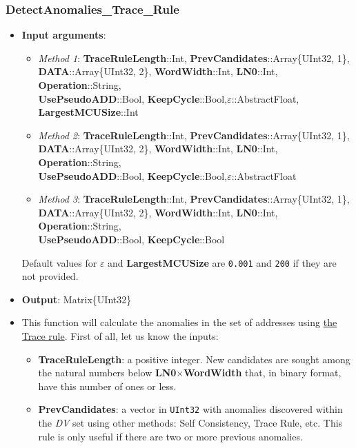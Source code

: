  \subsubsection*{DetectAnomalies\_Trace\_Rule}\label{Fun:DetectAnomaliesTraceRule}
 \begin{itemize}
	 \item \textbf{Input arguments}: 
	 \begin{itemize}
	 	\item \textit{Method 1}: \textbf{TraceRuleLength}::Int, \textbf{PrevCandidates}::Array\{UInt32, 1\}, \\ \textbf{DATA}::Array\{UInt32, 2\}, \textbf{WordWidth}::Int, \textbf{LN0}::Int,  \textbf{Operation}::String, \\ \textbf{UsePseudoADD}::Bool, \textbf{KeepCycle}::Bool,\textbf{\(\varepsilon\)}::AbstractFloat, \textbf{LargestMCUSize}::Int
	 	\item \textit{Method 2}: \textbf{TraceRuleLength}::Int, 
	 	\textbf{PrevCandidates}::Array\{UInt32, 1\}, \\ \textbf{DATA}::Array\{UInt32, 2\}, \textbf{WordWidth}::Int, \textbf{LN0}::Int,  \textbf{Operation}::String, \\ \textbf{UsePseudoADD}::Bool, \textbf{KeepCycle}::Bool,\textbf{\(\varepsilon\)}::AbstractFloat
	 	\item \textit{Method 3}: \textbf{TraceRuleLength}::Int,
	 	\textbf{PrevCandidates}::Array\{UInt32, 1\}, \\ \textbf{DATA}::Array\{UInt32, 2\}, \textbf{WordWidth}::Int, \textbf{LN0}::Int,  \textbf{Operation}::String, \\ \textbf{UsePseudoADD}::Bool, \textbf{KeepCycle}::Bool
	 \end{itemize}
	 Default values for \textbf{\(\varepsilon\)} and \textbf{LargestMCUSize} are \texttt{0.001} and \texttt{200} if they are not provided.
	 \item \textbf{Output}: Matrix\{UInt32\}
	 \item This function will calculate the anomalies in the set of addresses using \hyperref[Subsec:TraceRule]{the Trace rule}. 
	 First of all, let us know the inputs:
	 \begin{itemize}
	 	\item \textbf{TraceRuleLength}: a positive integer. New candidates are sought among the natural numbers below \textbf{LN0}\(\times\)\textbf{WordWidth} that, in binary format, have this number of ones or less.
	 	
	 	\item \textbf{PrevCandidates}: a vector in \texttt{UInt32} with anomalies discovered within the \textit{DV} set using other methods: Self Consistency, Trace Rule, etc. This rule is only useful if there are two or more previous anomalies. 
	 	

\end{itemize}
\end{itemize}
